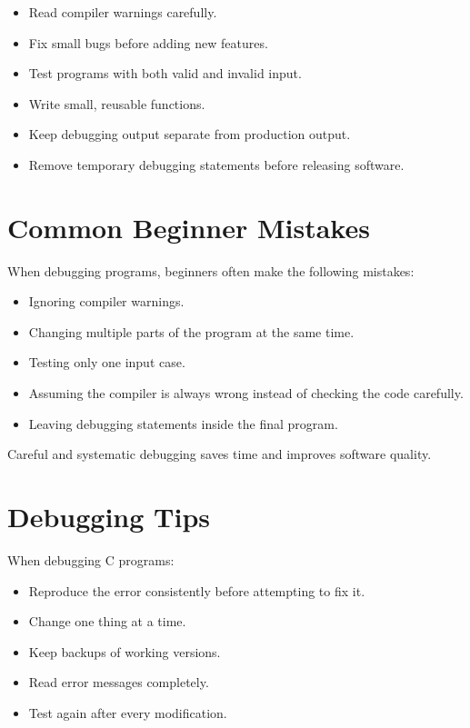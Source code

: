 \documentclass[12pt,openany]{book}
\begin{document}
\begin{itemize}
    \item Read compiler warnings carefully.
    \item Fix small bugs before adding new features.
    \item Test programs with both valid and invalid input.
    \item Write small, reusable functions.
    \item Keep debugging output separate from production output.
    \item Remove temporary debugging statements before releasing software.
\end{itemize}
\section{Common Beginner Mistakes}

When debugging programs, beginners often make the following mistakes:

\begin{itemize}
    \item Ignoring compiler warnings.
    \item Changing multiple parts of the program at the same time.
    \item Testing only one input case.
    \item Assuming the compiler is always wrong instead of checking the code carefully.
    \item Leaving debugging statements inside the final program.
\end{itemize}

Careful and systematic debugging saves time and improves software quality.

\section{Debugging Tips}

When debugging C programs:

\begin{itemize}
    \item Reproduce the error consistently before attempting to fix it.
    \item Change one thing at a time.
    \item Keep backups of working versions.
    \item Read error messages completely.
    \item Test again after every modification.
\end{itemize}
\end{document}
